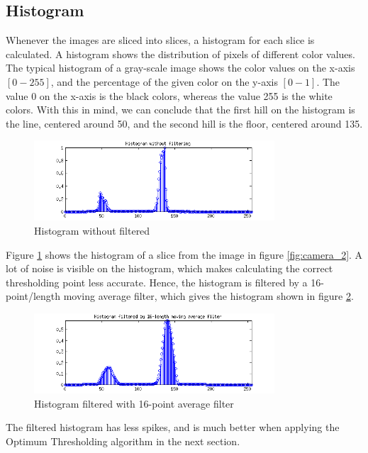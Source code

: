 %
%
%
%
\subsection{Histogram}

Whenever the images are sliced into slices, a histogram for each slice is calculated. A histogram shows the distribution of pixels of different color values. The typical histogram of a gray-scale image shows the color values on the x-axis $[0-255]$, and the percentage of the given color on the y-axis $[0-1]$. The value 0 on the x-axis is the black colors, whereas the value 255 is the white colors. With this in mind, we can conclude that the first hill on the histogram is the line, centered around 50, and the second hill is the floor, centered around 135.

\begin{figure}[!ht]
	\centering
	\includegraphics[width=0.8\textwidth]{resources/hist-no-filter}
	\caption{Histogram without filtered}
	\label{fig:camera_3}
\end{figure}

Figure \ref{fig:camera_3} shows the histogram of a slice from the image in figure \ref{fig:camera_2}. A lot of noise is visible on the histogram, which makes calculating the correct thresholding point less accurate. Hence, the histogram is filtered by a 16-point/length moving average filter, which gives the histogram shown in figure \ref{fig:camera_4}.

\begin{figure}[!ht]
	\centering
	\includegraphics[width=0.8\textwidth]{resources/hist-filter}
	\caption{Histogram filtered with 16-point average filter}
	\label{fig:camera_4}
\end{figure}

The filtered histogram has less spikes, and is much better when applying the Optimum Thresholding algorithm in the next section.


